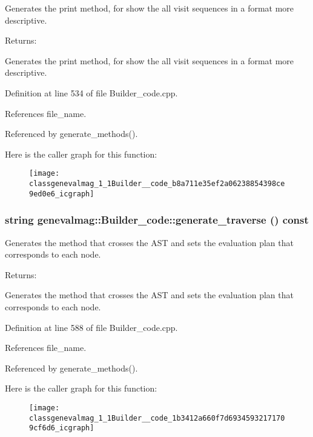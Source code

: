 Generates the print method, for show the all visit sequences in a format more descriptive. \begin{Desc}
\item[Returns:]\end{Desc}
Generates the print method, for show the all visit sequences in a format more descriptive. 

Definition at line 534 of file Builder\_\-code.cpp.

References file\_\-name.

Referenced by generate\_\-methods().

Here is the caller graph for this function:\nopagebreak
\begin{figure}[H]
\begin{center}
\leavevmode
\texttt{[image: classgenevalmag\_1\_1Builder\_\_code\_b8a711e35ef2a06238854398ce9ed0e6\_icgraph]}
\end{center}
\end{figure}
\hypertarget{classgenevalmag_1_1Builder__code_1b3412a660f7d69345932171709cf6d6}{
\subsubsection[{generate\_\-traverse}]{\setlength{\rightskip}{0pt plus 5cm}string genevalmag::Builder\_\-code::generate\_\-traverse () const}}
\label{classgenevalmag_1_1Builder__code_1b3412a660f7d69345932171709cf6d6}


Generates the method that crosses the AST and sets the evaluation plan that corresponds to each node. \begin{Desc}
\item[Returns:]\end{Desc}
Generates the method that crosses the AST and sets the evaluation plan that corresponds to each node. 

Definition at line 588 of file Builder\_\-code.cpp.

References file\_\-name.

Referenced by generate\_\-methods().

Here is the caller graph for this function:\nopagebreak
\begin{figure}[H]
\begin{center}
\leavevmode
\texttt{[image: classgenevalmag\_1\_1Builder\_\_code\_1b3412a660f7d69345932171709cf6d6\_icgraph]}
\end{center}
\end{figure}


